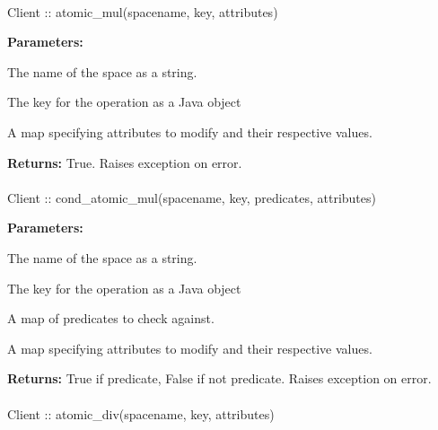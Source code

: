 \paragraph{}
\label{api:java:atomic_mul}
\begin{javacode}
Client :: atomic_mul(spacename, key, attributes)
\end{javacode}


\noindent\textbf{Parameters:}
\begin{description}[labelindent=\widthof{{\code{attributes}}},leftmargin=*,noitemsep,nolistsep,align=right]
\item[\code{spacename}] The name of the space as a string.
\item[\code{key}] The key for the operation as a Java object
\item[\code{attributes}] A map specifying attributes to modify and their respective values.
\end{description}

\noindent\textbf{Returns:}
True.  Raises exception on error.

\paragraph{}
\label{api:java:cond_atomic_mul}
\begin{javacode}
Client :: cond_atomic_mul(spacename, key, predicates, attributes)
\end{javacode}


\noindent\textbf{Parameters:}
\begin{description}[labelindent=\widthof{{\code{predicates}}},leftmargin=*,noitemsep,nolistsep,align=right]
\item[\code{spacename}] The name of the space as a string.
\item[\code{key}] The key for the operation as a Java object
\item[\code{predicates}] A map of predicates to check against.
\item[\code{attributes}] A map specifying attributes to modify and their respective values.
\end{description}

\noindent\textbf{Returns:}
True if predicate, False if not predicate.  Raises exception on error.

\paragraph{}
\label{api:java:atomic_div}
\begin{javacode}
Client :: atomic_div(spacename, key, attributes)
\end{javacode}


